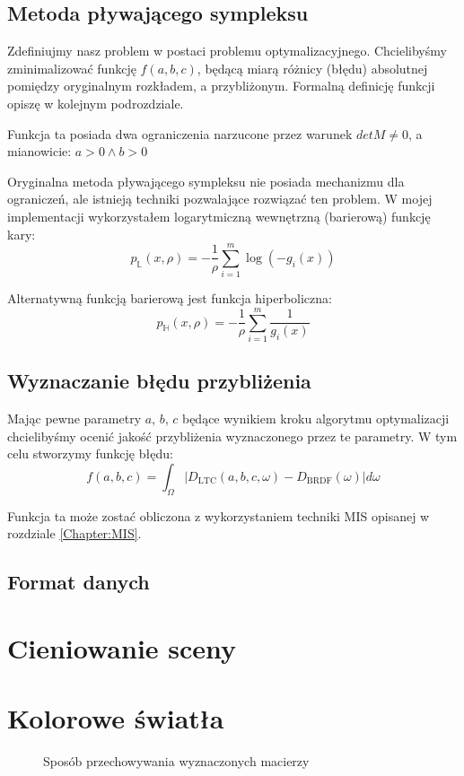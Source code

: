 \documentclass[../main.tex]{subfiles}
\begin{document}
\subsection{Metoda pływającego sympleksu}

Zdefiniujmy nasz problem w postaci problemu optymalizacyjnego. Chcielibyśmy
zminimalizować funkcję $f(a,b,c)$, będącą miarą różnicy (błędu) absolutnej
pomiędzy oryginalnym rozkładem, a przybliżonym. Formalną definicję funkcji
opiszę w kolejnym podrozdziale.

Funkcja ta posiada dwa ograniczenia narzucone przez warunek $detM \neq 0$,
a mianowicie:
  $a > 0 \wedge b > 0$

Oryginalna metoda pływającego sympleksu nie posiada mechanizmu dla ograniczeń,
ale istnieją techniki pozwalające rozwiązać ten problem. W mojej implementacji
wykorzystałem logarytmiczną wewnętrzną (barierową) funkcję kary:
\[
  p_{\mathbb{L}}(x, \rho) = - \frac{1}{\rho} \sum_{i=1}^{m} \log(-g_i(x))
\]

Alternatywną funkcją barierową jest funkcja hiperboliczna:
\[
  p_{\mathbb{H}}(x, \rho) =
    - \frac{1}{\rho} \sum_{i=1}^{m} \frac{1}{g_i(x)}
\]

\subsection{Wyznaczanie błędu przybliżenia}

Mając pewne parametry $a$, $b$, $c$ będące wynikiem kroku algorytmu optymalizacji
chcielibyśmy ocenić jakość przybliżenia wyznaczonego przez te parametry. W tym
celu stworzymy funkcję błędu:
\[
  f(a,b,c) =
    \int_{\Omega} {
      \left| {D_{\text{LTC}}(a, b, c, \omega) - D_{\text{BRDF}}(\omega)} \right|
    } d \omega
\]

Funkcja ta może zostać obliczona z wykorzystaniem techniki MIS opisanej w
rozdziale \ref{Chapter:MIS}.

\subsection{Format danych}

\section{Cieniowanie sceny}

\section{Kolorowe światła}

\begin{figure}[h]
    \centering
    \caption{Sposób przechowywania wyznaczonych macierzy}
    \label{fig:LTCFormat}
\end{figure}
\end{document}
